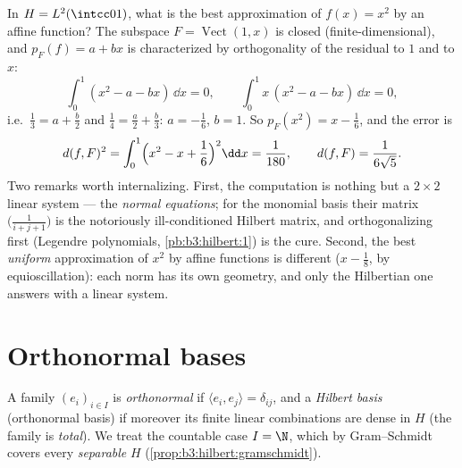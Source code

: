\begin{example}
\label{ex:b3:hilbert:projectionexample}
In $H = L^2(\intcc01)$, what is the best approximation of
$f(x) = x^2$ by an affine function? The subspace $F =
\operatorname{Vect}(1, x)$ is closed (finite-dimensional),
and $p_F(f) = a + bx$ is characterized by orthogonality of
the residual to $1$ and to $x$:
\[
\int_0^1(x^2 - a - bx)\,\dd x = 0,
\qquad
\int_0^1x\,(x^2 - a - bx)\,\dd x = 0,
\]
i.e.\ $\frac13 = a + \frac b2$ and $\frac14 = \frac a2 +
\frac b3$: $a = -\frac16$, $b = 1$. So $p_F(x^2) = x -
\frac16$, and the error is
\[
d(f, F)^2 = \int_0^1\Bigl(x^2 - x + \frac16\Bigr)^2\dd x =
\frac1{180},
\qquad d(f, F) = \frac1{6\sqrt5} .
\]
Two remarks worth internalizing. First, the computation is
nothing but a $2\times2$ linear system --- the \emph{normal
equations}; for the monomial basis their matrix
$\bigl(\frac1{i+j+1}\bigr)$ is the notoriously
ill-conditioned Hilbert matrix, and orthogonalizing first
(Legendre polynomials, \cref{pb:b3:hilbert:1}) is the cure.
Second, the best \emph{uniform} approximation of $x^2$ by
affine functions is different ($x - \frac18$, by
equioscillation): each norm has its own geometry, and only
the Hilbertian one answers with a linear system.
\end{example}

\section{Orthonormal bases}

\begin{definition}\label{def:b3:hilbert:onb}
A family $(e_i)_{i\in I}$ is \emph{orthonormal} if $\langle
e_i, e_j\rangle = \delta_{ij}$, and a \emph{Hilbert
basis} (orthonormal basis) if moreover
its finite linear combinations are dense in $H$ (the family is
\emph{total}). We treat the countable case $I = \N$, which by
Gram--Schmidt covers every \emph{separable} $H$
(\cref{prop:b3:hilbert:gramschmidt}).
\end{definition}

